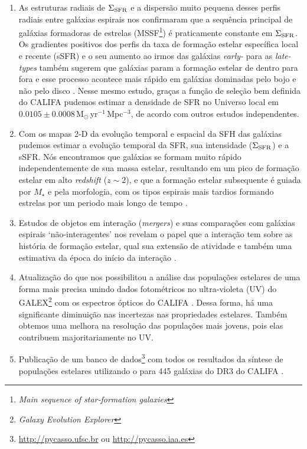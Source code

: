 \begin{enumerate}[label=(\roman*)]
  \item As estruturas radiais de $\Sigma_{\rm SFR}$ e a dispersão muito pequena desses perfis radiais entre galáxias espirais nos confirmaram que a sequência principal de galáxias formadoras de estrelas (MSSF\footnote{\em Main sequence of star-formation galaxies}) é praticamente constante em $\Sigma_{\rm SFR}$. Os gradientes positivos dos perfis da taxa de formação estelar específica local e recente (sSFR) e o seu aumento ao irmos das galáxias {\em early-} para as {\em late-types} também sugerem que galáxias param a formação estelar de dentro para fora e esse processo acontece mais rápido em galáxias dominadas pelo bojo e não pelo disco \citep{GonzalezDelgado.etal.2016a}. Nesse mesmo estudo, graças a função de seleção bem definida do CALIFA \citep{Walcher.etal.2014} pudemos estimar a densidade de SFR no Universo local em $0.0105 \pm 0.0008\,$M$_\odot\,$yr$^{-1}\,$Mpc$^{-3}$, de acordo com outros estudos independentes.
  \item Com os mapas 2-D da evolução temporal e espacial da SFH das galáxias pudemos estimar a evolução temporal da SFR, sua intensidade ($\Sigma_{\rm SFR}$) e a sSFR. Nós encontramos que galáxias se formam muito rápido independentemente de sua massa estelar, resultando em um pico de formação estelar em alto {\em redshift} ($z \sim 2$), e que a formação estelar subsequente é guiada por $M_\star$ e pela morfologia, com os tipos espirais mais tardios formando estrelas por um periodo mais longo de tempo \citep{GonzalezDelgado.etal.2017}.
  \item Estudos de objetos em interação ({\em mergers}) e suas comparações com galáxias espirais `não-interagentes' nos revelam o papel que a interação tem sobre as história de formação estelar, qual sua extensão de atividade e também uma estimativa da época do início da interação \citep{CortijoFerrero.etal.2017a, CortijoFerrero.etal.2017b, CortijoFerrero.etal.2017c}.
  \item Atualização do \starlight que nos possibilitou a análise das populações estelares de uma forma mais precisa unindo dados fotométricos no ultra-violeta (UV) do GALEX\footnote{\em Galaxy Evolution Explorer} \citep{Martin.etal.2005} com os espectros ópticos do CALIFA \citep{LopezFernandez.etal.2016}. Dessa forma, há uma significante diminuição nas incertezas nas propriedades estelares. Também obtemos uma melhora na resolução das populações mais jovens, pois elas contribuem majoritariamente no UV.
  \item Publicação de um banco de dados\footnote{\href{http://pycasso.ufsc.br}{http://pycasso.ufsc.br} ou \href{http://pycasso.iaa.es}{http://pycasso.iaa.es}} com todos os resultados da síntese de populações estelares utilizando o \starlight para 445 galáxias do DR3 do CALIFA \citep{deAmorim.etal.2017}.
\end{enumerate}

